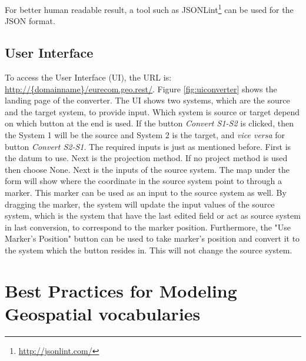 For better human readable result, a tool such as JSONLint\footnote{ \url{http://jsonlint.com/}} can be used for the JSON format.


\subsection{User Interface}
To access the User Interface (UI), the URL is: \url{http://{domainname}/eurecom.geo.rest/}. Figure \ref{fig:uiconverter} shows the landing page of the converter. The UI shows two systems, which are the source and the target system, to provide input. Which system is source or target depend on which button at the end is used. If the button \textit{Convert S1-S2} is clicked, then the System 1 will be the source and System 2 is the target, and \textit{vice versa} for button \textit{Convert S2-S1}.
The required inputs is just as mentioned before. First is the datum to use. Next is the projection method. If no project method is used then choose None. Next is the inputs of the source system.
The map under the form will show where the coordinate in the source system point to through a marker. This marker can be used as an input to the source system as well.
By dragging the marker, the system will update the input values of the source system, which is the system that have the last edited field or act as source system in last conversion, to correspond to the marker position. Furthermore, the "Use Marker's Position" button can be used to take marker's position and convert it to the system which the button resides in. This will not change the source system.


\begin{figure}[!htp]
\end{figure}


\section{Best Practices for Modeling Geospatial vocabularies}
\label{sec:bpgeo}

